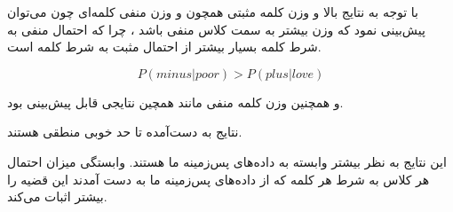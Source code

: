 \begin{boxL}
    با توجه به نتایج بالا و وزن  کلمه مثبتی همچون 
    و وزن منفی کلمه‌ای چون 
    می‌توان پیش‌بینی نمود که وزن بیشتر به سمت کلاس منفی باشد ، چرا که احتمال منفی به شرط کلمه 
    بسیار بیشتر از احتمال مثبت به شرط کلمه
    است.
    
    \begin{equation*}
        P(minus | poor) > P(plus | love)
    \end{equation*}
    
    
    و همچنین وزن کلمه منفی مانند
    همچین نتایجی قابل پیش‌بینی بود.

    نتایج به دست‌آمده تا حد خوبی منطقی هستند. 

     
     این نتایج به نظر بیشتر وابسته به داده‌های 
    پس‌زمینه 
    ما هستند.
    وابستگی میزان احتمال هر کلاس به شرط هر کلمه که از داده‌های پس‌زمینه ما به دست آمدند این قضیه را بیشتر اثبات می‌کند.
    
\end{boxL}

